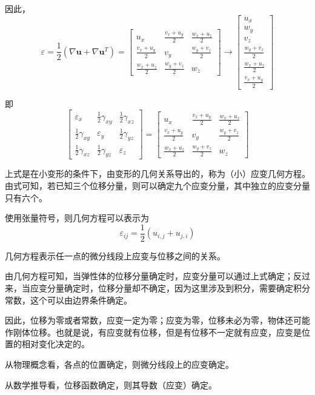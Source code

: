 \documentclass[12pt,a4paper]{article}
\begin{document}
因此，
$$
\varepsilon = \frac{1}{2}(\nabla\textbf{u} + \nabla\textbf{u}^T) 
=\begin{bmatrix}
u_x & \frac{v_x + u_y}{2} & \frac{w_x + u_z}{2} \\
\frac{v_x + u_y}{2} & v_y & \frac{w_y + v_z}{2} \\
\frac{w_x + u_z}{2} & \frac{w_y + v_z}{2} & w_z 
\end{bmatrix}
\rightarrow 
\begin{bmatrix}
u_x \\ w_y \\ v_z \\ \frac{w_y + v_z}{2} \\ \frac{w_x + u_z}{2} \\ \frac{v_x + u_y}{2}
\end{bmatrix}
$$

即
$$
\begin{bmatrix}
\varepsilon_{x} & \frac{1}{2}\gamma_{xy} & \frac{1}{2}\gamma_{xz} \\
\frac{1}{2}\gamma_{xy} & \varepsilon_{y} & \frac{1}{2}\gamma_{yz} \\
\frac{1}{2}\gamma_{xz} & \frac{1}{2}\gamma_{yz} & \varepsilon_{z}
\end{bmatrix}=\begin{bmatrix}
u_x & \frac{v_x + u_y}{2} & \frac{w_x + u_z}{2} \\
\frac{v_x + u_y}{2} & v_y & \frac{w_y + v_z}{2} \\
\frac{w_x + u_z}{2} & \frac{w_y + v_z}{2} & w_z 
\end{bmatrix}
$$

上式是在小变形的条件下，由变形的几何关系导出的，称为（小）应变几何方程。由式可知，若已知三个位移分量，则可以确定九个应变分量，其中独立的应变分量只有六个。

使用张量符号，则几何方程可以表示为
$$
\varepsilon_{ij}=\frac{1}{2}(u_{i,j}+u_{j,i})
$$

几何方程表示任一点的微分线段上应变与位移之间的关系。

由几何方程可知，当弹性体的位移分量确定时，应变分量可以通过上式确定；反过来，当应变分量确定时，位移分量却不确定，因为这里涉及到积分，需要确定积分常数，这个可以由边界条件确定。

因此，位移为零或者常数，应变一定为零；应变为零，位移未必为零，物体还可能作刚体位移。也就是说，有应变就有位移，但是有位移不一定就有应变，应变是位置的相对变化决定的。

从物理概念看，各点的位置确定，则微分线段上的应变确定。

从数学推导看，位移函数确定，则其导数（应变）确定。
\end{document}
